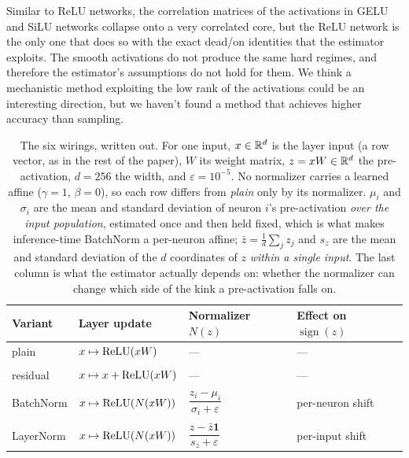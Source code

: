 Similar to ReLU networks, the correlation matrices of the activations in GELU and SiLU networks collapse onto a very correlated core, but the ReLU network is the only one that does so with the exact dead/on identities that the estimator exploits. The smooth activations do not produce the same hard regimes, and therefore the estimator's assumptions do not hold for them. We think a mechanistic method exploiting the low rank of the activations could be an interesting direction, but we haven't found a method that achieves higher accuracy than sampling.

\begin{table}[hbt!]
	\centering
	\small
	\caption{The six wirings, written out. For one input, $x \in \mathbb{R}^{d}$ is the layer input (a row vector, as in the rest of the paper), $W$ its weight matrix, $z = xW \in \mathbb{R}^{d}$ the pre-activation, $d = 256$ the width, and $\varepsilon = 10^{-5}$. No normalizer carries a learned affine ($\gamma = 1$, $\beta = 0$), so each row differs from \emph{plain} only by its normalizer. $\mu_i$ and $\sigma_i$ are the mean and standard deviation of neuron $i$'s pre-activation \emph{over the input population}, estimated once and then held fixed, which is what makes inference-time BatchNorm a per-neuron affine; $\bar z = \frac1d\sum_j z_j$ and $s_z$ are the mean and standard deviation of the $d$ coordinates of $z$ \emph{within a single input}. The last column is what the estimator actually depends on: whether the normalizer can change which side of the kink a pre-activation falls on.}
	\label{tab:architecture-definitions}
	\begin{tabular}{llll}
		\toprule
		Variant & Layer update & Normalizer $N(z)$ & Effect on $\operatorname{sign}(z)$ \\
		\midrule
		plain             & $x \mapsto \operatorname{ReLU}(xW)$                       & ---                                                              & --- \\
		\hline\\
		residual \citep{he2016identity} & $x \mapsto x + \operatorname{ReLU}(xW)$                   & ---                                                              & --- \\
		\hline\\
		BatchNorm \citep{ioffe2015batch} & $x \mapsto \operatorname{ReLU}(N(xW))$                    & $\dfrac{z_i - \mu_i}{\sigma_i + \varepsilon}$                      & per-neuron shift \\
		\hline\\
		LayerNorm \citep{ba2016layer} & $x \mapsto \operatorname{ReLU}(N(xW))$                    & $\dfrac{z - \bar z \mathbf{1}}{s_z + \varepsilon}$                 & per-input shift \\

\end{tabular}
\end{table}
